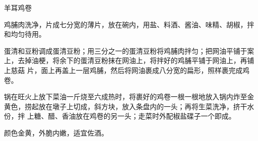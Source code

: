 \begin{recipe}{羊耳鸡卷}

\ingredients


\preparation

\step 鸡脯肉洗净，片成七分宽的薄片，放在碗内，用盐、料酒、酱油、味精、胡椒，拌
和均匀待用。

\step 蛋清和豆粉调成蛋清豆粉；用三分之一的蛋清豆粉将鸡脯肉拌匀；把网油平铺于案
上，去掉油梗，将余下的蛋清豆粉抹在网油上，将拌好的鸡脯平铺于网油上，再铺上慈菇
片，面上再盖上一层鸡脯，然后将网油裹成八分宽的扁形，照样裹完成鸡卷。

\step 锅在旺火上放下菜油一斤烧至六成热时，将裹好的鸡卷一根一根地放入锅内炸至金
黄色，捞起放在墩子上切成，斜方块，放入条盘内的一头；再将生菜洗净，挤干水份，拌
上糖、醋、香油放在鸡卷的另一头；走菜时外配椒盐碟子一个即成。

\features

颜色金黄，外脆内嫩，适宜佐酒。

\end{recipe}

